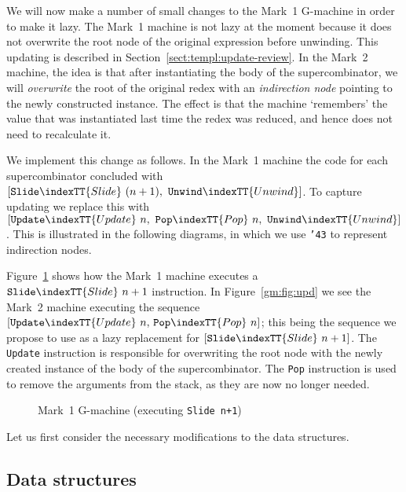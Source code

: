 We will now make a number of small changes to the Mark~1 G-machine in
order to make it lazy. The Mark~1 machine is not lazy at the moment
because it does not overwrite the root node of the original expression
before unwinding. This updating is described in
Section~\ref{sect:templ:update-review}.
In the Mark~2 machine, the idea is that after instantiating the body
of the supercombinator, we will {\em overwrite\/} the
root of the original redex with an {\em indirection
node\/} pointing to the newly constructed
instance. The effect is that the machine `remembers' the value that
was instantiated last time the redex was reduced, and hence does not
need to recalculate it.

We implement this change as follows. In the Mark~1 machine the code
for each supercombinator concluded with $[\mbox{\tt Slide}\indexTT{Slide}\ (n+1),\ \mbox{\tt Unwind}\indexTT{Unwind}]$.
To capture updating we replace this with $[\mbox{\tt Update}\indexTT{Update}\ n,\ \mbox{\tt Pop}\indexTT{Pop}\ n,\
\mbox{\tt Unwind}\indexTT{Unwind}]$. This is illustrated in the following diagrams, in which we
use \mbox{\tt {\char'43}} to represent indirection nodes.

Figure~\ref{gm:fig:slide} shows how the Mark~1 machine executes a
$\mbox{\tt Slide}\indexTT{Slide}\ n+1$ instruction. In Figure~\ref{gm:fig:upd} we see the
Mark~2 machine executing the sequence $[\mbox{\tt Update}\indexTT{Update}\ n,\, \mbox{\tt Pop}\indexTT{Pop}\ n]$;
this being the sequence we propose to use as a lazy replacement for
$[\mbox{\tt Slide}\indexTT{Slide}\ n+1]$. The \mbox{\tt Update} instruction is responsible for
overwriting the root node with the newly created instance of the body
of the supercombinator.  The \mbox{\tt Pop}\indexTT{Pop} instruction is used to remove the
arguments from the stack, as they are now no longer needed.
\begin{figure} %

\caption{Mark~1 G-machine (executing \mbox{\tt Slide\ n+1})}
\label{gm:fig:slide}
\end{figure}
\begin{figure*} %

\caption{Mark~2 G-machine (executing \mbox{\tt [Update\ n,\ Pop\ n]})}
\label{gm:fig:upd}
\end{figure*}

Let us first consider the necessary modifications to the data structures.

\subsection{Data structures}

